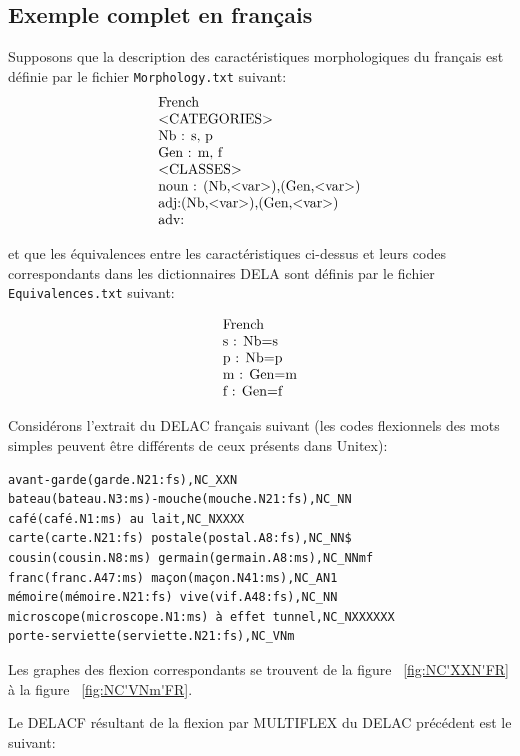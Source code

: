 \subsection{Exemple complet en français}
Supposons que la description des caractéristiques morphologiques du français est définie par le
fichier \verb+Morphology.txt+ suivant:
\[
\begin{array}[l]{l}
$French$ \\
$<CATEGORIES>$ \\
$Nb : s, p$ \\
$Gen : m, f$ \\
$<CLASSES>$ \\
$noun : (Nb,<var>),(Gen,<var>)$ \\
$adj:(Nb,<var>),(Gen,<var>)$ \\
$adv:$
\end{array}
\]

\bigskip
\noindent et que les équivalences entre les caractéristiques ci-dessus et leurs codes correspondants
dans les dictionnaires DELA sont définis par le fichier \verb+Equivalences.txt+ suivant:

\[
\begin{array}[l]{l}
$French$ \\
$s : Nb=s$ \\
$p : Nb=p$ \\
$m : Gen=m$ \\
$f : Gen=f$
\end{array}
\]

\bigskip
\noindent Considérons l'extrait du DELAC français suivant (les codes flexionnels des mots simples
peuvent être différents de ceux présents dans Unitex):

\begin{verbatim}
avant-garde(garde.N21:fs),NC_XXN
bateau(bateau.N3:ms)-mouche(mouche.N21:fs),NC_NN
café(café.N1:ms) au lait,NC_NXXXX
carte(carte.N21:fs) postale(postal.A8:fs),NC_NN$
cousin(cousin.N8:ms) germain(germain.A8:ms),NC_NNmf
franc(franc.A47:ms) maçon(maçon.N41:ms),NC_AN1
mémoire(mémoire.N21:fs) vive(vif.A48:fs),NC_NN
microscope(microscope.N1:ms) à effet tunnel,NC_NXXXXXX
porte-serviette(serviette.N21:fs),NC_VNm
\end{verbatim}


\bigskip
\noindent Les graphes des flexion correspondants se trouvent de la figure ~\ref{fig:NC'XXN'FR} à la
figure ~\ref{fig:NC'VNm'FR}. 

\bigskip
\noindent Le DELACF résultant de la flexion par MULTIFLEX du DELAC précédent est le suivant:


